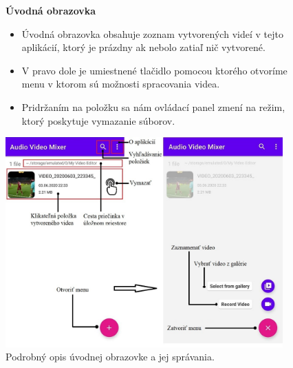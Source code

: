 \documentclass[12pt, oneside]{book}
\begin{document}
\begin{figure}[H]

    \hspace{15pt} \textbf{Úvodná obrazovka}
    
\begin{itemize}
        \item Úvodná obrazovka obsahuje zoznam vytvorených videí v tejto aplikácií, ktorý je prázdny ak nebolo zatiaľ nič vytvorené. 
        \item V pravo dole je umiestnené tlačidlo pomocou ktorého otvoríme menu v ktorom sú možnosti spracovania videa.
        \item Pridržaním na položku sa nám ovládací panel zmení na režim, ktorý poskytuje vymazanie súborov.
    \end{itemize}

   
  
\vspace{15pt}


\hspace{0.5cm}
  \includegraphics[width=0.95\textwidth]{images/uvodna0.jpg}
    \caption{Podrobný opis úvodnej obrazovke a jej správania.}
    \label{fig:obr10}
    
\end{figure}
\end{document}
